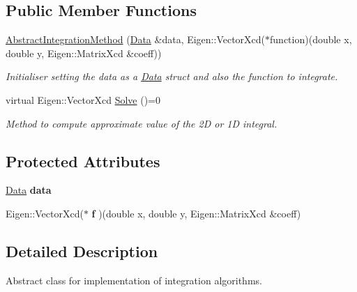 \subsection*{Public Member Functions}
\begin{DoxyCompactItemize}
\item 
\mbox{\label{class_abstract_integration_method_ac9094172e42a206908a2724cb25159c0}} 
\hyperlink{class_abstract_integration_method_ac9094172e42a206908a2724cb25159c0}{Abstract\+Integration\+Method} (\hyperlink{struct_data}{Data} \&data, Eigen\+::\+Vector\+Xcd($\ast$function)(double x, double y, Eigen\+::\+Matrix\+Xcd \&coeff))
\begin{DoxyCompactList}\small\item\em Initialiser setting the data as a \hyperlink{struct_data}{Data} struct and also the function to integrate. \end{DoxyCompactList}\item 
virtual Eigen\+::\+Vector\+Xcd \hyperlink{class_abstract_integration_method_af76e5bdce7d0b139d07e920fa29c1c34}{Solve} ()=0
\begin{DoxyCompactList}\small\item\em Method to compute approximate value of the 2D or 1D integral. \end{DoxyCompactList}\end{DoxyCompactItemize}
\subsection*{Protected Attributes}
\begin{DoxyCompactItemize}
\item 
\mbox{\label{class_abstract_integration_method_a534b5ff7dfbccc1332cfbe66e817b389}} 
\hyperlink{struct_data}{Data} {\bfseries data}
\item 
\mbox{\label{class_abstract_integration_method_af94033e3acb2f881e9973480809e2e2f}} 
Eigen\+::\+Vector\+Xcd($\ast$ {\bfseries f} )(double x, double y, Eigen\+::\+Matrix\+Xcd \&coeff)
\end{DoxyCompactItemize}


\subsection{Detailed Description}
Abstract class for implementation of integration algorithms. 

